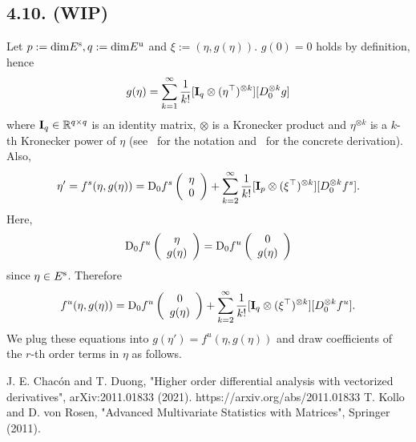 \documentclass[a4paper,11pt,fleqn]{article}
\begin{document}
\subsection{4.10. (WIP)}
Let $p:= {\rm dim}E^{\rm s}, q:= {\rm dim}E^{\rm u}$ and $\xi:=(\eta,g(\eta))$. $g(0)=0$ holds by definition, hence  
\begin{equation}
    g(\eta) = \sum_{k=1}^\infty{\frac{1}{k!}[{\bf I}_q \otimes (\eta^\top)^{\otimes k}] [D_0^{\otimes k}g] }
\end{equation} 
where ${\bf I}_q \in \mathbb{R}^{q\times q}$ is an identity matrix, $\otimes$ is a Kronecker product and $\eta^{\otimes k}$ is a $k$-th Kronecker power of $\eta$ (see~\cite{Chacon} for the notation and~\cite[Th~1.4.8]{Kollo} for the concrete derivation). Also, 
\begin{align}
    \eta' = f^s(\eta,g(\eta)) = {\rm D}_0f^s \left(\begin{array}{c}
        \eta \\
        0
    \end{array}\right)
    + \sum_{k=2}^\infty{\frac{1}{k!}[{\bf I}_p \otimes (\xi^\top)^{\otimes k}] [D_0^{\otimes k}f^s] }.
\end{align}
Here, 
\begin{equation}
    {\rm D}_0f^u \left(\begin{array}{c}
        \eta \\
        g(\eta)
    \end{array}\right)
    = {\rm D}_0f^u \left(\begin{array}{c}
        0 \\
        g(\eta)
    \end{array}\right)
\end{equation}
since $\eta \in E^{\rm s}$. Therefore
\begin{align}
    f^u(\eta,g(\eta)) = {\rm D}_0f^u \left(\begin{array}{c}
        0 \\
        g(\eta)
    \end{array}\right)
    + \sum_{k=2}^\infty{\frac{1}{k!}[{\bf I}_q \otimes (\xi^\top)^{\otimes k}] [D_0^{\otimes k}f^u] }.
\end{align}
We plug these equations into $g(\eta') = f^u(\eta,g(\eta))$ and draw coefficients of the $r$-th order terms in $\eta$ as follows.  

\begin{thebibliography}{99}
     J. E. Chac\'{o}n and T. Duong, "Higher order differential analysis with vectorized derivatives", arXiv:2011.01833 (2021). https://arxiv.org/abs/2011.01833    
     T. Kollo and D. von Rosen, "Advanced Multivariate Statistics with Matrices", Springer (2011). 
\end{thebibliography}
\end{document}
